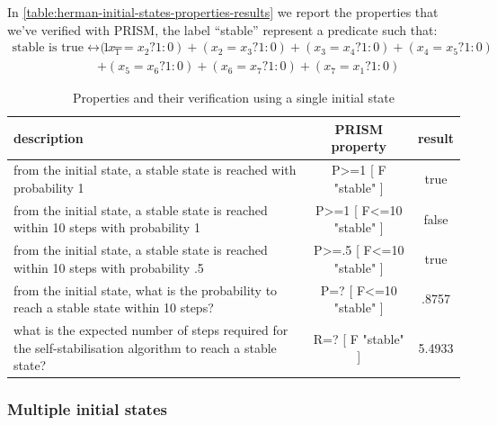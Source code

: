 In \autoref{table:herman-initial-states-properties-results} we report
the properties that we've verified with PRISM, the label ``stable''
represent a predicate such that:
\begin{displaymath}
  \begin{split}
    \text{stable is true} \leftrightarrow 1 = &(x_1=x_2?1:0)+(x_2=x_3?1:0)+(x_3=x_4?1:0)+(x_4=x_5?1:0)\\
    &+(x_5=x_6?1:0)+(x_6=x_7?1:0)+(x_7=x_1?1:0)
  \end{split}
\end{displaymath}


\begin{table}[ht]
  \begin{center}
    \begin{tabular}{p{5cm}cc}
      \hline
      description & PRISM property  & result \\
      \hline     
      from the initial state, a stable state is reached with
      probability 1 & P>=1 [ F "stable" ] & true \\
      from the initial state, a stable state is reached within 10
      steps with probability 1 & P>=1 [ F<=10 "stable" ] & false\\
      from the initial state, a stable state is reached within 10
      steps with probability .5 & P>=.5 [ F<=10 "stable" ] & true\\
      from the initial state, what is the probability to reach a
      stable state within 10 steps? & P=? [ F<=10 "stable" ] & .8757\\
      what is the expected number of steps required for the
      self-stabilisation algorithm to reach a stable state? & R=? [ F
      "stable" ] & 5.4933\\
      \hline
    \end{tabular}
    \caption{Properties and their verification using a single initial
      state}
    \label{table:herman-initial-states-properties-results}
  \end{center}
\end{table}

\subsubsection{Multiple initial states}

